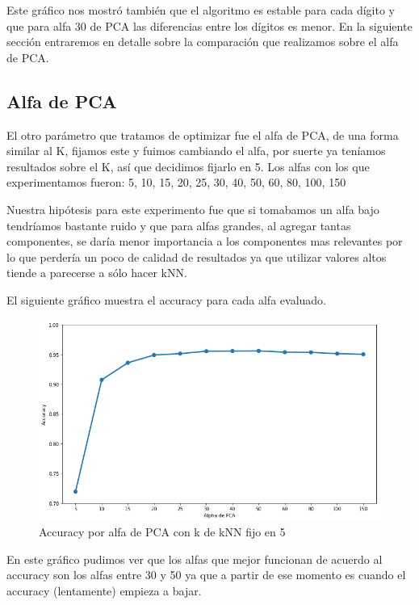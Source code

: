 Este gráfico nos mostró también que el algoritmo es estable para cada dígito y que para alfa 30 de PCA las diferencias entre los dígitos es menor. En la siguiente sección entraremos en detalle sobre la comparación que realizamos sobre el alfa de PCA.

\subsection{Alfa de PCA}

El otro parámetro que tratamos de optimizar fue el alfa de PCA, de una forma similar al K, fijamos este y fuimos cambiando el alfa, por suerte ya teníamos resultados sobre el K, así que decidimos fijarlo en 5. Los alfas con los que experimentamos fueron: 5, 10, 15, 20, 25, 30, 40, 50, 60, 80, 100, 150

Nuestra hipótesis para este experimento fue que si tomabamos un alfa bajo tendríamos bastante ruido y que para alfas grandes, al agregar tantas componentes, se daría menor importancia a los componentes mas relevantes por lo que perdería un poco de calidad de resultados ya que utilizar valores altos tiende a parecerse a sólo hacer kNN.

El siguiente gráfico muestra el accuracy para cada alfa evaluado.

\begin{figure}[H]
    \begin{center}
      \includegraphics[width=0.8\columnwidth]{imagenes/Accuracy_all_alpha.png}
      \caption{Accuracy por alfa de PCA con k de kNN fijo en 5}
    \end{center}
\end{figure}

En este gráfico pudimos ver que los alfas que mejor funcionan de acuerdo al accuracy son los alfas entre 30 y 50 ya que a partir de ese momento es cuando el accuracy (lentamente) empieza a bajar.

